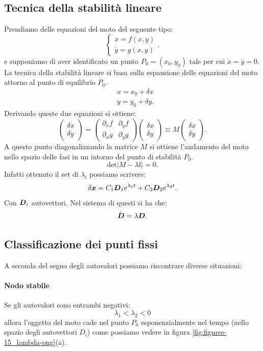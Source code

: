 \subsection{Tecnica della stabilità lineare}%
\label{sub:Tecnica della stabilità lineare}
Prendiamo delle equazioni del moto del seguente tipo:
\[
    \begin{cases}
	\dot{x} = f(x, y) \\
	\dot{y} = g(x,y) 
    \end{cases}
.\] 
e supponiamo di aver identificato un punto $P_0=(x_0, y_0)$ tale per cui $\dot{x}=\dot{y}=0$.\\
La tecnica della stabilità lineare si basa sulla espansione delle equazioni del moto attorno al punto di equilibrio $P_0$.
\[\begin{aligned}
    & x = x_0 + \delta x\\
    & y = y_0 + \delta y
.\end{aligned}\]
Derivando queste due equazioni si ottiene: 
\[
    \begin{pmatrix} \delta\dot{x} \\ \delta\dot{y} \end{pmatrix} =
    \begin{pmatrix} 
	\partial_{x}f & \partial_{y}f\\
	\partial_{x}g & \partial_{y}g
    \end{pmatrix} 
    \begin{pmatrix} \delta x \\ \delta y \end{pmatrix} 
    \equiv 
    M 
    \begin{pmatrix} \delta x \\ \delta y \end{pmatrix} 
.\] 
A questo punto diagonalizzando la matrice $M$ si ottiene l'andamento del moto nello spazio delle fasi in un intorno del punto di stabilità $P_0$.
\[
    \text{det}\left|M-\lambda\mathbb{I}\right|=0
.\] 
Infatti ottenuto il set di $\lambda_i$ possiamo scrivere:
\[
    \delta \boldsymbol{x} = C_1\boldsymbol{D}_1e^{\lambda_1t} + C_2\boldsymbol{D}_2e^{\lambda_2t}
.\] 
Con $\boldsymbol{D}_i$ autovettori. Nel sistema di questi si ha che:
\[
    \dot{\boldsymbol{D}}  = \lambda  \boldsymbol{D}
.\] 
\subsection{Classificazione dei punti fissi}%
\label{sub:Classificazione dei punti fissi}
A seconda del segno degli autovalori possiamo riscontrare diverse situazioni:
\paragraph{Nodo stabile}%
\label{par:Nodo stabile}
Se gli autovalori sono entrambi negativi:
\[
    \lambda_1<\lambda_2<0
\] 
allora l'oggetto del moto cade nel punto $P_0$ esponenzialmente nel tempo (nello spazio degli autovettori $D_i$) come possiamo vedere in figura \ref{fig:figures-15_lambda-png}(a).

